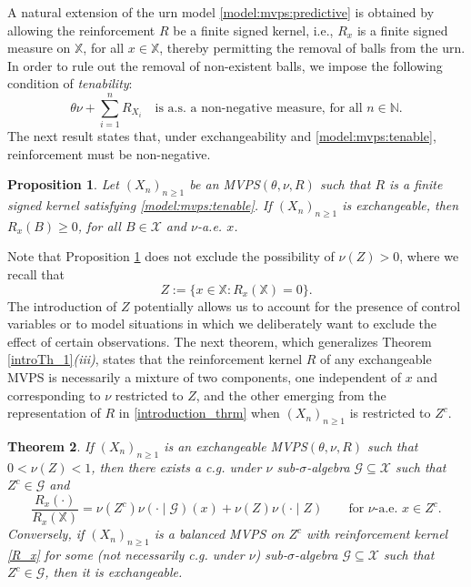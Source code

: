 \documentclass[a4paper]{article}
\theoremstyle{plain}
\newtheorem{theorem}{Theorem}
\newtheorem{proposition}[theorem]{Proposition}
\theoremstyle{remark}
\theoremstyle{definition}
\begin{document}
A natural extension of the urn model \eqref{model:mvps:predictive} is obtained by allowing the reinforcement $R$ be a finite signed kernel, i.e., $R_x$ is a finite signed measure on $\mathbb{X}$, for all $x\in\mathbb{X}$, thereby permitting the removal of balls from the urn. In order to rule out the removal of non-existent balls, we impose the following condition of \textit{tenability}:
\begin{equation}\label{model:mvps:tenable}
\theta\nu+\sum_{i=1}^nR_{X_i}\quad\mbox{is a.s. a non-negative measure, for all }n\in\mathbb{N}.
\end{equation}
The next result states that, under exchangeability and \eqref{model:mvps:tenable}, reinforcement must be non-negative.

\begin{proposition}\label{results:null:non-negative}
Let $(X_n)_{n\geq1}$ be an MVPS$(\theta,\nu,R)$ such that $R$ is a finite signed kernel satisfying \eqref{model:mvps:tenable}. If $(X_n)_{n\geq1}$ is exchangeable, then $R_x(B)\geq0$, for all $B\in\mathcal{X}$ and $\nu$-a.e. $x$.
\end{proposition}

Note that Proposition \ref{results:null:non-negative} does not exclude the possibility of $\nu(Z)>0$, where we recall that
\[Z:=\{x\in\mathbb{X}:R_x(\mathbb{X})=0\}.\]
The introduction of $Z$ potentially allows us to account for the presence of control variables or to model situations in which we deliberately want to exclude the effect of certain observations. The next theorem, which generalizes Theorem \ref{introTh_1}\textit{(iii)}, states that the reinforcement kernel $R$ of any exchangeable MVPS is necessarily a mixture of two components, one independent of $x$ and corresponding to $\nu$ restricted to $Z$, and the other emerging from the representation of $R$ in \eqref{introduction_thrm} when $(X_n)_{n\geq 1}$ is restricted to $Z^c$.

\begin{theorem}
\label{representation}
If $(X_n)_{n\geq1}$ is an exchangeable MVPS$(\theta,\nu,R)$ such that $0<\nu(Z)<1$, then there exists a c.g. under $\nu$ sub-$\sigma$-algebra $\mathcal{G}\subseteq\mathcal{X}$ such that $Z^c\in\mathcal{G}$ and
\begin{equation} \label{R_x}
\frac{R_x(\cdot)}{R_x(\mathbb{X})}=\nu(Z^c)\nu(\cdot\mid\mathcal{G})(x)+\nu(Z)\nu(\cdot\mid Z)\qquad\mbox{for }\nu\mbox{-a.e. }x\in Z^c.
\end{equation}
Conversely, if $(X_n)_{n\geq1}$ is a balanced MVPS on $Z^c$ with reinforcement kernel \eqref{R_x} for some (not necessarily c.g. under $\nu$) sub-$\sigma$-algebra $\mathcal{G}\subseteq\mathcal{X}$ such that $Z^c\in\mathcal{G}$, then it is exchangeable.
\end{theorem}
\end{document}
